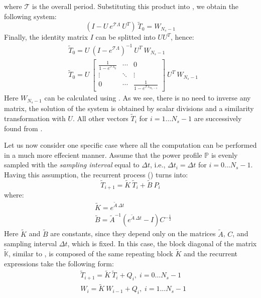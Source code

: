 where $\mathcal{T}$ is the overall period. Substituting this product into , we obtain the following system:
\[
  (I - U \: e^{\mathcal{T} \Lambda} \: U^T) \: \tilde{T}_0 = W_{N_s - 1}
\]
Finally, the identity matrix $I$ can be splitted into $U U^T$, hence:
\begin{align*}
  & \tilde{T}_0 = U \: (I - e^{\mathcal{T} \Lambda})^{-1} \: U^T \: W_{N_s - 1} \\
  & \tilde{T}_0 = U \: \left[
      \begin{array}{ccc}
        \frac{1}{1 - e^{\mathcal{T} \lambda_0}} & \cdots & 0 \\
        \vdots & \ddots & \vdots \\
        0 & \cdots & \frac{1}{1 - e^{\mathcal{T} \lambda_{N_n - 1}}}
      \end{array}
    \right] \: U^T \: W_{N_s - 1}
\end{align*}
Here $W_{N_s - 1}$ can be calculated using . As we see, there is no need to inverse any matrix, the solution of the system is obtained by scalar divisions and a similarity transformation with $U$. All other vectors $\tilde{T}_i$ for $i = 1 \dots N_s - 1$ are successively found from .

Let us now consider one specific case where all the computation can be performed in a much more effecient manner. Assume that the power profile $\mathbb{P}$ is evenly sampled with the \emph{sampling interval} equal to $\Delta t$, i.e., $\Delta t_i = \Delta t$ for $i = 0 \dots N_s - 1$. Having this assumption, the recurrent process () turns into:
\[
  \tilde{T}_{i+1} = \tilde{K} \: \tilde{T}_i + \tilde{B} \: P_i
\]
where:
\begin{align*}
  & \tilde{K} = e^{\tilde{A} \: \Delta t} \\
  & \tilde{B} = \tilde{A}^{-1} \left( e^{\tilde{A} \: \Delta t} - I \right) C^{-\frac{1}{2}}
\end{align*}
Here $\tilde{K}$ and $\tilde{B}$ are constants, since they depend only on the matrices $\tilde{A}$, $C$, and sampling interval $\Delta t$, which is fixed. In this case, the block diagonal of the matrix $\tilde{\mathbb{K}}$, similar to , is composed of the same repeating block $\tilde{K}$ and the recurrent expressions take the following form:
\begin{align}
  & \tilde{T}_{i + 1} = \tilde{K} \: \tilde{T}_i + Q_i, \; i = 0 \dots N_s - 1 \nonumber \\
  & W_i = \tilde{K} \: W_{i - 1} + Q_i, \; i = 1 \dots N_s - 1 \nonumber
\end{align}
